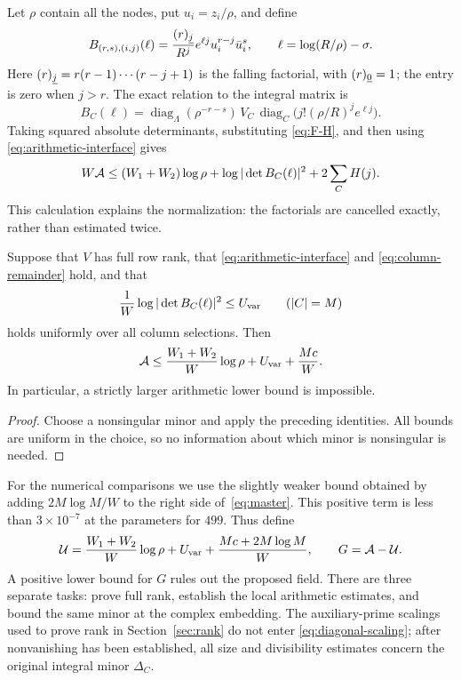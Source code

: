 Let $\rho$ contain all the nodes, put $u_i=z_i/\rho$, and define
\begin{equation}\label{eq:residual-matrix}
 B_{(r,s),(i,j)}(\ell)
 =\frac{(r)_{\underline{j}}}{R^j}e^{\ell j}u_i^{r-j}\bar u_i^{s},
 \qquad \ell=\log(R/\rho)-\sigma.
\end{equation}
Here $(r)_{\underline{j}}=r(r-1)\cdots(r-j+1)$ is the falling factorial, with
$(r)_{\underline{0}}=1$; the entry is zero when $j>r$. The exact relation to the integral matrix is
\begin{equation}\label{eq:diagonal-scaling}
 B_C(\ell)
 =\operatorname{diag}_{\Lambda}(\rho^{-r-s})\,
 V_C\,
 \operatorname{diag}_{C}\bigl(j!(\rho/R)^je^{\ell j}\bigr).
\end{equation}
Taking squared absolute determinants, substituting \eqref{eq:F-H}, and then using \eqref{eq:arithmetic-interface} gives
\[
 W\mathcal A\leq (W_1+W_2)\log\rho
       +\log|\det B_C(\ell)|^2+2\sum_C H(j).
\]
This calculation explains the normalization: the factorials are cancelled exactly, rather than estimated twice.

\begin{proposition}\label{prop:comparison}
Suppose that $V$ has full row rank, that \eqref{eq:arithmetic-interface} and \eqref{eq:column-remainder} hold, and that
\[
 \frac1W\log|\det B_C(\ell)|^2\leq U_{\rm var}
 \qquad (|C|=M)
\]
holds uniformly over all column selections. Then
\begin{equation}\label{eq:master}
 \mathcal A\leq \frac{W_1+W_2}{W}\log\rho
                  +U_{\rm var}+\frac{Mc}{W}.
\end{equation}
In particular, a strictly larger arithmetic lower bound is impossible.
\end{proposition}
\begin{proof}
Choose a nonsingular minor and apply the preceding identities. All bounds are uniform in the choice, so no information about which minor is nonsingular is needed.
\end{proof}

For the numerical comparisons we use the slightly weaker bound obtained
by adding $2M\log M/W$ to the right side of~\eqref{eq:master}.
This positive term is less than $3\times10^{-7}$ at the parameters for $499$.
Thus define
\begin{equation}\label{eq:metric-total}
 \mathcal U=\frac{W_1+W_2}{W}\log\rho+U_{\rm var}
             +\frac{Mc+2M\log M}{W},
 \qquad G=\mathcal A-\mathcal U.
\end{equation}
A positive lower bound for $G$ rules out the proposed field. There are three separate tasks: prove full rank, establish the local arithmetic estimates, and bound the same minor at the complex embedding. The auxiliary-prime scalings used to prove rank in Section~\ref{sec:rank} do not enter \eqref{eq:diagonal-scaling}; after nonvanishing has been established, all size and divisibility estimates concern the original integral minor $\Delta_C$.

